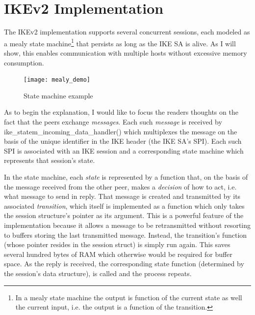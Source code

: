 \documentclass[final,a4paper,twoside,11pt,onecolumn]{report}
\begin{document}
% 
% 
% 
% 

\section{IKEv2 Implementation}
The IKEv2 implementation supports several concurrent sessions, each modeled as a mealy state machine\footnote{In a mealy state machine the output is function of the current state as well the current input, i.e. the output is a function of the transition.} that persists as long as the IKE SA is alive. As I will show, this enables communication with multiple hosts without excessive memory consumption.

\begin{figure}[h!]
   \texttt{[image: mealy\_demo]}
   \caption{State machine example}
   \label{fig:mealydemo}
\end{figure}

As to begin the explanation, I would like to focus the readers thoughts on the fact that the peers exchange \emph{messages}. Each such \emph{message} is received by ike\_statem\_incoming\_data\_handler() which multiplexes the message on the basis of the unique identifier in the IKE header (the IKE SA's SPI). Each such SPI is associated with an IKE session and a corresponding state machine which represents that session's state.

In the state machine, each \emph{state} is represented by a function that, on the basis of the message received from the other peer, makes a \emph{decision} of how to act, i.e. what message to send in reply. That message is created and transmitted by its associated \emph{transition}, which itself is implemented as a function which only takes the session structure's pointer as its argument. This is a powerful feature of the implementation because it allows a message to be retransmitted without resorting to buffers storing the last transmitted message. Instead, the transition's function (whose pointer resides in the session struct) is simply run again. This saves several hundred bytes of RAM which otherwise would be required for buffer space. As the reply is received, the corresponding state function (determined by the session's data structure), is called and the process repeats.
\end{document}
